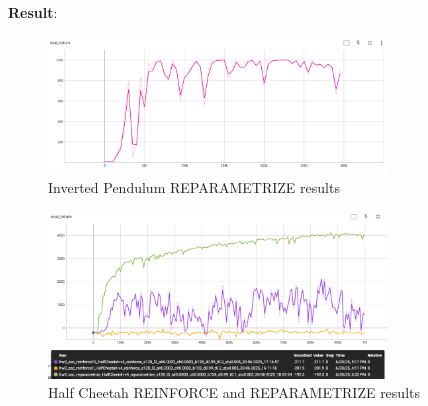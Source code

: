 \textbf{Result}:

\begin{figure}[H]
    \centering
    \includegraphics[width=0.8\textwidth]{imgs/sac/sanity_reparametrize_invertPendulum.png}
    \caption{Inverted Pendulum REPARAMETRIZE results}
    \label{fig:inverted_pendulum_reparametrize}
\end{figure}

\begin{figure}[H]
    \centering
    \includegraphics[width=0.8\textwidth]{imgs/sac/half_cheetah_reinforce1_and_10_and_reparametrize.png}
    \caption{Half Cheetah REINFORCE and REPARAMETRIZE results}
    \label{fig:half_cheetah_reparametrize}
\end{figure}


